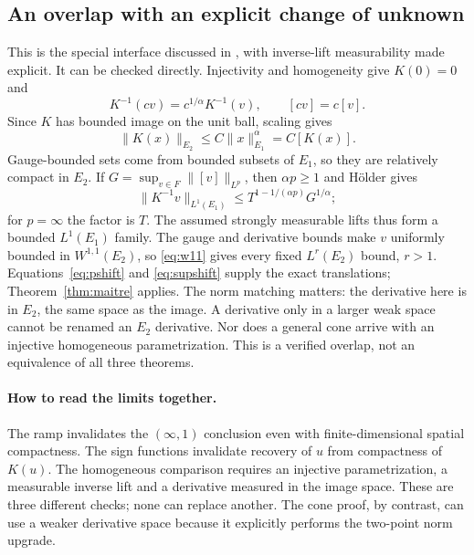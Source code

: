 \documentclass[12pt,reqno]{amsart}
\begin{document}
\subsection{An overlap with an explicit change of unknown}
\begin{proposition}\label{prop:overlap}

\end{proposition}
This is the special interface discussed in \cite[Section 4, pp.~15--16]{S-barrett-suli}, with inverse-lift measurability made explicit. It can be checked directly.
Injectivity and homogeneity give $K(0)=0$ and
\[
K^{-1}(cv)=c^{1/\alpha}K^{-1}(v),\qquad [cv]=c[v].
\]
Since $K$ has bounded image on the unit ball, scaling gives
\[
\|K(x)\|_{E_2}\le C\|x\|_{E_1}^{\alpha}=C[K(x)].
\]
Gauge-bounded sets come from bounded subsets of $E_1$, so they are relatively compact in $E_2$.
If $G=\sup_{v\in F}\|[v]\|_{L^p}$, then $\alpha p\ge1$ and H\"older gives
\begin{equation}\label{eq:lift}
\|K^{-1}v\|_{L^1(E_1)}
\le T^{1-1/(\alpha p)}G^{1/\alpha};
\end{equation}
for $p=\infty$ the factor is $T$. The assumed strongly measurable lifts thus form a bounded $L^1(E_1)$ family. The gauge and derivative bounds make $v$ uniformly bounded in $W^{1,1}(E_2)$, so \eqref{eq:w11} gives every fixed $L^r(E_2)$ bound, $r>1$. Equations~\eqref{eq:pshift} and \eqref{eq:supshift} supply the exact translations; Theorem~\ref{thm:maitre} applies.
The norm matching matters: the derivative here is in $E_2$, the same space as the image. A derivative only in a larger weak space cannot be renamed an $E_2$ derivative. Nor does a general cone arrive with an injective homogeneous parametrization. This is a verified overlap, not an equivalence of all three theorems.
\paragraph{How to read the limits together.}
The ramp invalidates the $(\infty,1)$ conclusion even with finite-dimensional spatial compactness. The sign functions invalidate recovery of $u$ from compactness of $K(u)$. The homogeneous comparison requires an injective parametrization, a measurable inverse lift and a derivative measured in the image space. These are three different checks; none can replace another. The cone proof, by contrast, can use a weaker derivative space because it explicitly performs the two-point norm upgrade.
\clearpage


\end{document}
